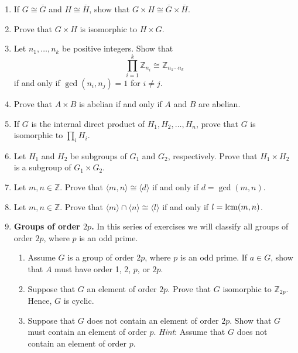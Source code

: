 {\begin{enumerate}
\item
If $G \cong \overline{G}$ and $H \cong \overline{H}$, show that $G
\times H \cong \overline{G} \times \overline{H}$.
 

\item
Prove that $G \times H$ is isomorphic to $H \times G$.
 

\item
Let $n_1, \ldots, n_k$ be positive integers. Show that
\[
\prod_{i=1}^k {\mathbb Z}_{n_i} \cong {\mathbb Z}_{n_1 \cdots n_k}
\]
if and only if $\gcd( n_i, n_j) =1$ for $i \neq j$.
 

\item
Prove that $A \times B$ is abelian if and only if $A$ and $B$ are
abelian. 
 

\item
If $G$ is the internal direct product of $H_1, H_2, \ldots, H_n$,
prove that $G$ is isomorphic to $\prod_i H_i$. 
 

\item
Let $H_1$ and $H_2$ be subgroups of $G_1$ and $G_2$, respectively. Prove that $H_1 \times H_2$ is a subgroup of $G_1 \times G_2$. 
 

\item
Let $m, n \in {\mathbb Z}$. Prove that $\langle m,n \rangle \cong \langle d \rangle$ if and only if $d = \gcd(m,n)$.
 

\item  %
Let $m, n \in {\mathbb Z}$. Prove that $\langle m \rangle \cap \langle n \rangle \cong \langle l \rangle$ if and only if $l = \operatorname{lcm}(m,n)$. 

\item %
{\bf Groups of order $2p$.}
In this series of exercises we will classify all groups of order $2p$, where $p$ is an odd prime.
\begin{enumerate}

\item
Assume $G$ is a group of order $2p$, where $p$ is an odd prime.  If $a \in G$, show that $A$ must have order 1, 2, $p$, or $2p$.


\item
Suppose that $G$ an element of order $2p$.  Prove that $G$ isomorphic to ${\mathbb Z}_{2p}$.  Hence, $G$ is cyclic.



\item
Suppose that $G$ does not contain an element of order $2p$.  Show that $G$ must contain an element of order $p$.  {\em Hint}:  Assume that $G$ does not contain an element of order $p$.




\end{enumerate}
\end{enumerate}}
